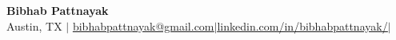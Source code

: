 \documentclass[letterpaper,10.5pt]{article}
\newcommand{\resumeItem}[1]{
  \item\small{
    {#1 \vspace{1pt}}
  }
}
\newcommand{\resumeItemListStart}{\begin{itemize}}
\newcommand{\resumeItemListEnd}{\end{itemize}\vspace{-5pt}}
\begin{document}
\begin{center}
	\small \textbf{\Large Bibhab Pattnayak} \\  
	Austin, TX \hspace{4pt}$\vert$ \hspace{4pt} \href{mailto:bpattnay@asu.edu}{\color{blue}\underline{bibhabpattnayak@gmail.com}}\hspace{4pt}$\vert$\hspace{4pt}\href{https://www.linkedin.com/in/bibhabpattnayak/}{\color{blue}\underline{linkedin.com/in/bibhabpattnayak/}\hspace{4pt}}$\vert$\hspace{4pt} \hspace{4pt}{480 - 955 - 9942} 
	\\ 
\end{center}
\vspace{-20pt}
\vspace{2pt}

\vspace{-5pt}



%
\end{document}
